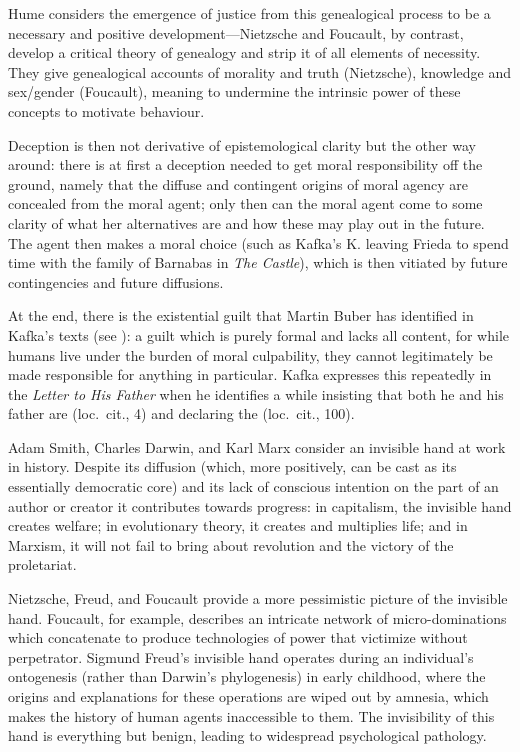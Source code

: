 \documentclass[11pt]{article}
\begin{document}
Hume considers the emergence of justice from this genealogical process
to be a necessary and positive development---Nietzsche and Foucault,
by contrast, develop a critical theory of genealogy and strip it of
all elements of necessity. They give genealogical accounts of morality
and truth (Nietzsche), knowledge and sex/gender (Foucault), meaning to
undermine the intrinsic power of these concepts to motivate behaviour.

Deception is then not derivative of epistemological clarity but the
other way around: there is at first a deception needed to get moral
responsibility off the ground, namely that the diffuse and contingent
origins of moral agency are concealed from the moral agent; only then
can the moral agent come to some clarity of what her alternatives are
and how these may play out in the future. The agent then makes a moral
choice (such as Kafka's K. leaving Frieda to spend time with the
family of Barnabas in \emph{The Castle}), which is then vitiated by
future contingencies and future diffusions.

At the end, there is the existential guilt that Martin Buber has
identified in Kafka's texts (see ): a guilt which
is purely formal and lacks all content, for while humans live under
the burden of moral culpability, they cannot legitimately be made
responsible for anything in particular. Kafka expresses this
repeatedly in the \emph{Letter to His Father} when he identifies a
  while
insisting that both he and his father are 
(loc.\ cit., 4) and declaring the 
(loc.\ cit., 100).

Adam Smith, Charles Darwin, and Karl Marx consider an invisible hand
at work in history. Despite its diffusion (which, more positively, can
be cast as its essentially democratic core) and its lack of conscious
intention on the part of an author or creator it contributes towards
progress: in capitalism, the invisible hand creates welfare; in
evolutionary theory, it creates and multiplies life; and in Marxism,
it will not fail to bring about revolution and the victory of the
proletariat.

Nietzsche, Freud, and Foucault provide a more pessimistic picture of
the invisible hand. Foucault, for example, describes an intricate
network of micro-dominations which concatenate to produce technologies
of power that victimize without perpetrator. Sigmund Freud's invisible
hand operates during an individual's ontogenesis (rather than Darwin's
phylogenesis) in early childhood, where the origins and explanations
for these operations are wiped out by amnesia, which makes the history
of human agents inaccessible to them. The invisibility of this hand is
everything but benign, leading to widespread psychological pathology.
\end{document}
